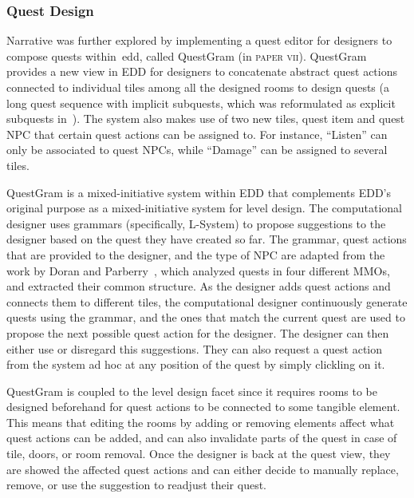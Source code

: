 
\subsubsection{Quest Design}

Narrative was further explored by implementing a quest editor for designers to compose quests within~\acrshort{edd}, called QuestGram (in \textsc{paper vii}). QuestGram provides a new view in EDD for designers to concatenate abstract quest actions connected to individual tiles among all the designed rooms to design quests (a long quest sequence with implicit subquests, which was reformulated as explicit subquests in~\cite{larsson_queststories_2021}). The system also makes use of two new tiles, quest item and quest NPC that certain quest actions can be assigned to. For instance, ``Listen'' can only be associated to quest NPCs, while ``Damage'' can be assigned to several tiles. 

QuestGram is a mixed-initiative system within EDD that complements EDD's original purpose as a mixed-initiative system for level design. The computational designer uses grammars (specifically, L-System) to propose suggestions to the designer based on the quest they have created so far. The grammar, quest actions that are provided to the designer, and the type of NPC are adapted from the work by Doran and Parberry~\cite{doran_prototype_2011}, which analyzed quests in four different MMOs, and extracted their common structure. As the designer adds quest actions and connects them to different tiles, the computational designer continuously generate quests using the grammar, and the ones that match the current quest are used to propose the next possible quest action for the designer. The designer can then either use or disregard this suggestions. They can also request a quest action from the system ad hoc at any position of the quest by simply clickling on it.

QuestGram is coupled to the level design facet since it requires rooms to be designed beforehand for quest actions to be connected to some tangible element. This means that editing the rooms by adding or removing elements affect what quest actions can be added, and can also invalidate parts of the quest in case of tile, doors, or room removal. Once the designer is back at the quest view, they are showed the affected quest actions and can either decide to manually replace, remove, or use the suggestion to readjust their quest. 

